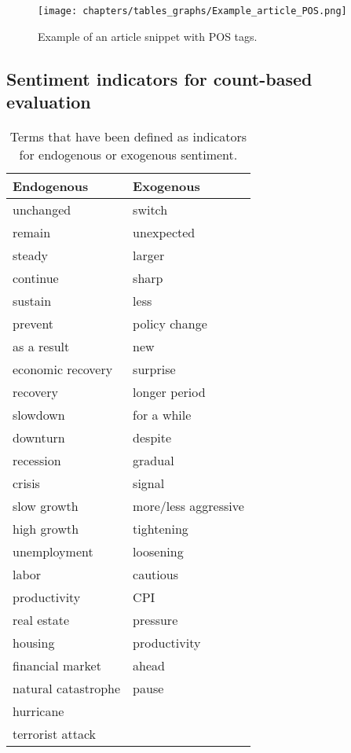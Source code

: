 %
%
\begin{figure}[!h]
	\centering
	\texttt{[image: chapters/tables\_graphs/Example\_article\_POS.png]} 
	\caption{Example of an article snippet with POS tags.}
	\label{fig:POStaggedArticle}
\end{figure}
%

\newpage
\subsection{Sentiment indicators for count-based evaluation}
%
\begin{table}[!h]
	\tiny
	\caption{Terms that have been defined as indicators for endogenous or exogenous sentiment.}
	\label{tab:sentiment_words}
	\centering
	\begin{tabular}{ll}
		\toprule
		Endogenous & Exogenous \\
		\midrule
		unchanged &	switch\\
		remain	&	unexpected\\
		steady	&	larger\\
		continue	&	sharp\\
		sustain	&	less\\
		prevent	&	policy change\\
		as a result	&	new\\
		economic recovery	&	surprise\\
		recovery	&	longer period\\
		slowdown	&	for a while\\
		downturn	&	despite\\
		recession	&	gradual\\
		crisis	&	signal\\
		slow growth	&	more/less aggressive\\
		high growth	&	tightening\\
		unemployment	&	loosening\\
		labor	&	cautious\\
		productivity	&	CPI\\
		real estate	&	pressure\\
		housing	&	productivity\\
		financial market	&	ahead\\
		natural catastrophe	&	pause\\
		hurricane	&	\\
		terrorist attack	&	\\	
		\bottomrule
	\end{tabular}
\end{table}
%

